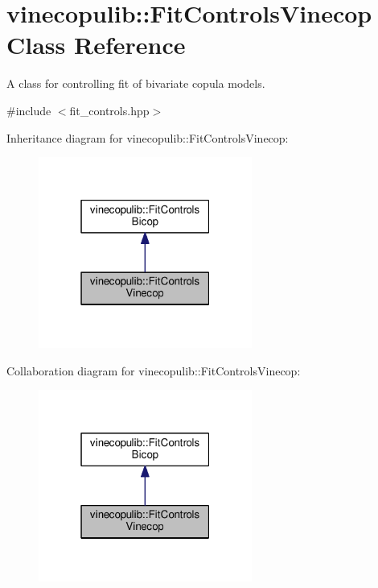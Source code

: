 \hypertarget{classvinecopulib_1_1_fit_controls_vinecop}{}\section{vinecopulib\+:\+:Fit\+Controls\+Vinecop Class Reference}
\label{classvinecopulib_1_1_fit_controls_vinecop}


A class for controlling fit of bivariate copula models.  




{\ttfamily \#include $<$fit\+\_\+controls.\+hpp$>$}



Inheritance diagram for vinecopulib\+:\+:Fit\+Controls\+Vinecop\+:\nopagebreak
\begin{figure}[H]
\begin{center}
\leavevmode
\includegraphics[width=199pt]{classvinecopulib_1_1_fit_controls_vinecop__inherit__graph}
\end{center}
\end{figure}


Collaboration diagram for vinecopulib\+:\+:Fit\+Controls\+Vinecop\+:\nopagebreak
\begin{figure}[H]
\begin{center}
\leavevmode
\includegraphics[width=199pt]{classvinecopulib_1_1_fit_controls_vinecop__coll__graph}
\end{center}
\end{figure}

